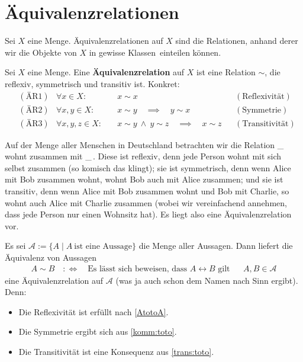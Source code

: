 \section{Äquivalenzrelationen}
Sei $X$ eine Menge. Äquivalenzrelationen auf $X$ sind die Relationen, anhand derer wir die Objekte von $X$ in gewisse \glqq Klassen\grqq\, einteilen können.

\begin{de}
	Sei $X$ eine Menge. Eine \textbf{Äquivalenzrelation} auf $X$ ist eine Relation $\sim$, die reflexiv, symmetrisch und transitiv ist. Konkret:
\begin{align*}
 & (\text{ÄR1}) & \forall x\in X:&\quad x\sim x && (\text{Reflexivität}) \\
& (\text{ÄR2}) & \forall x,y\in X:&\quad  x\sim y\quad \implies\quad y\sim x && (\text{Symmetrie}) \\
& (\text{ÄR3}) & \forall x,y,z\in X:&\quad x\sim y\ \wedge\ y\sim z \quad\implies\quad x\sim z && (\text{Transitivität})
 \end{align*}
\end{de}

\begin{bsp}[Wohngemeinschaften]
	Auf der Menge aller Menschen in Deutschland betrachten wir die Relation \glqq \_ wohnt zusammen mit \_\grqq\,. Diese ist reflexiv, denn jede Person wohnt mit sich selbst zusammen (so komisch das klingt); sie ist symmetrisch, denn wenn Alice mit Bob zusammen wohnt, wohnt Bob auch mit Alice zusammen; und sie ist transitiv, denn wenn Alice mit Bob zusammen wohnt und Bob mit Charlie, so wohnt auch Alice mit Charlie zusammen (wobei wir vereinfachend annehmen, dass jede Person nur einen Wohnsitz hat). Es liegt also eine Äquivalenzrelation vor.
\end{bsp}

\begin{bsp} \label{aussagenequiv}
Es sei $\mathcal{A}:= \{A\mid A\ \text{ist eine Aussage} \}$ die Menge aller Aussagen. Dann liefert die Äquivalenz von Aussagen
\begin{align*}
 A\sim B \quad:\Leftrightarrow\quad \text{Es lässt sich beweisen, dass $A\leftrightarrow B$ gilt} && A,B \in \mathcal{A}
\end{align*}
eine Äquivalenzrelation auf $\mathcal{A}$ (was ja auch schon dem Namen nach Sinn ergibt). Denn:
\begin{itemize}
 \item Die Reflexivität ist erfüllt nach \cref{AtotoA}.
 \item Die Symmetrie ergibt sich aus \cref{komm:toto}.
 \item Die Transitivität ist eine Konsequenz aus \cref{trans:toto}.
\end{itemize}
\end{bsp}


